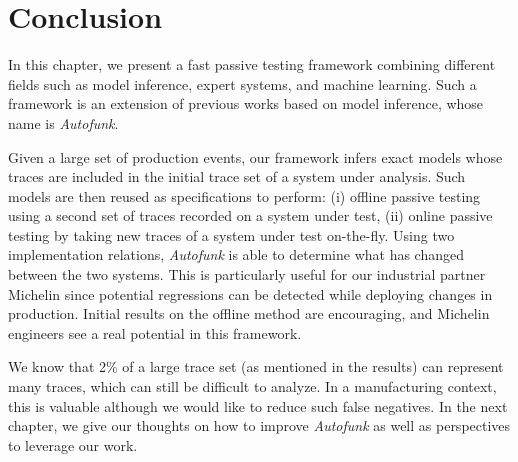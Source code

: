 \section{Conclusion}
\label{sec:testing:conclusion}

In this chapter, we present a fast passive testing framework
combining different fields such as model inference, expert
systems, and machine learning. Such a framework is an extension
of previous works based on model inference, whose name is
\textit{Autofunk}.

Given a large set of production events, our framework infers
exact models whose traces are included in the initial trace set
of a system under analysis. Such models are then reused as
specifications to perform: (i) offline passive testing using a
second set of traces recorded on a system under test, (ii) online
passive testing by taking new traces of a system under test
on-the-fly. Using two implementation relations, \textit{Autofunk}
is able to determine what has changed between the two systems.
This is particularly useful for our industrial partner Michelin
since potential regressions can be detected while deploying
changes in production. Initial results on the offline method are
encouraging, and Michelin engineers see a real potential in this
framework.

We know that 2\% of a large trace set (as mentioned in the
results) can represent many traces, which can still be difficult
to analyze. In a manufacturing context, this is valuable although
we would like to reduce such false negatives. In the next
chapter, we give our thoughts on how to improve \textit{Autofunk}
as well as perspectives to leverage our work.
